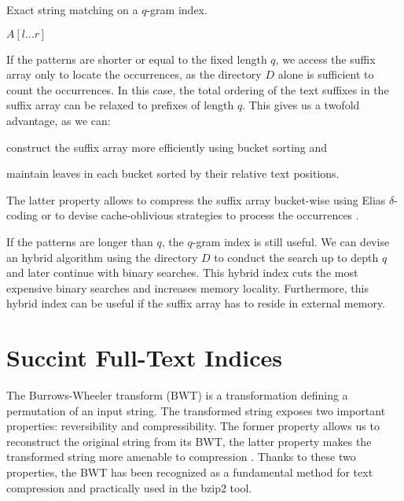 \begin{algorithm}[h]
\caption{Exact string matching on a $q$-gram index.}
\label{alg:qgram-exact}
\begin{algorithmic}[1]
	\State \Report $A[l \dots r]$
\EndProcedure
\end{algorithmic}
\end{algorithm}

If the patterns are shorter or equal to the fixed length $q$, we access the suffix array only to locate the occurrences, as the directory $D$ alone is sufficient to count the occurrences.
In this case, the total ordering of the text suffixes in the suffix array can be relaxed to prefixes of length $q$.
This gives us a twofold advantage, as we can:
\begin{inparaenum}[(i)]
\item construct the suffix array more efficiently using bucket sorting and
\item maintain leaves in each bucket sorted by their relative text positions.
\end{inparaenum}
The latter property allows to compress the suffix array bucket-wise \eg using Elias $\delta$-coding \citep{?} or to devise cache-oblivious strategies to process the occurrences \citep{?}.

If the patterns are longer than $q$, the $q$-gram index is still useful.
We can devise an hybrid algorithm using the directory $D$ to conduct the search up to depth $q$ and later continue with binary searches.
This hybrid index cuts the most expensive binary searches and increases memory locality.
Furthermore, this hybrid index can be useful if the suffix array has to reside in external memory.

\section{Succint Full-Text Indices}

The Burrows-Wheeler transform (BWT) \citep{Burrows1994} is a transformation defining a permutation of an input string.
The transformed string exposes two important properties: reversibility and compressibility.
The former property allows us to reconstruct the original string from its BWT, the latter property makes the transformed string more amenable to compression \citep{?}.
Thanks to these two properties, the BWT has been recognized as a fundamental method for text compression and practically used in the bzip2 \citep{?} tool.

